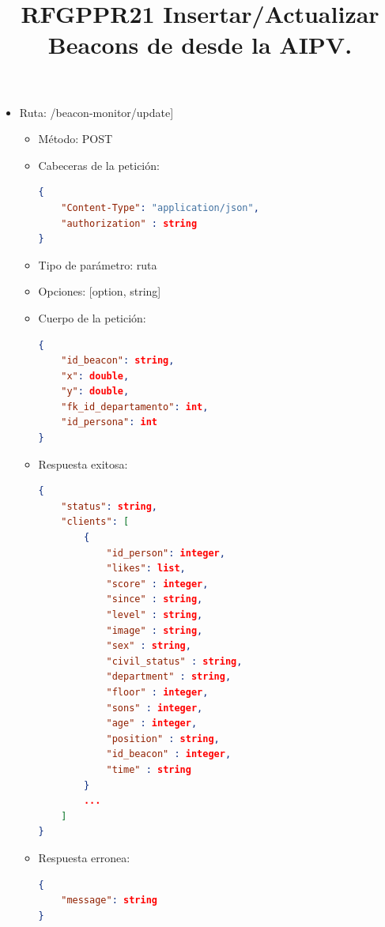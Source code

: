 \title{\textbf{RFGPPR21 Insertar/Actualizar Beacons de desde la AIPV.}}
\begin{itemize}
\item Ruta: /beacon-monitor/update]
\begin{itemize}
\item Método: POST
\item Cabeceras de la petición: 
\begin{lstlisting}[language=json,firstnumber=1]
{
	"Content-Type": "application/json",
	"authorization" : string
}
\end{lstlisting}
\item Tipo de parámetro: ruta
\item Opciones: [option, string] 
\item Cuerpo de la petición:
\begin{lstlisting}[language=json,firstnumber=1]
{
	"id_beacon": string,
	"x": double,
	"y": double,
	"fk_id_departamento": int,
	"id_persona": int
}
\end{lstlisting}
\item Respuesta exitosa: 
\begin{lstlisting}[language=json,firstnumber=1]
{
	"status": string,
	"clients": [
		{
			"id_person": integer,
			"likes": list,
			"score" : integer,
			"since" : string,
			"level" : string,
			"image" : string,
			"sex" : string,
			"civil_status" : string,
			"department" : string,
			"floor" : integer,
			"sons" : integer,
			"age" : integer,
			"position" : string,
			"id_beacon" : integer,
			"time" : string
		}
		...		
	]	
}
\end{lstlisting}
\item Respuesta erronea: 
\begin{lstlisting}[language=json,firstnumber=1]
{
	"message": string 
}
\end{lstlisting}
\end{itemize}
\end{itemize}



